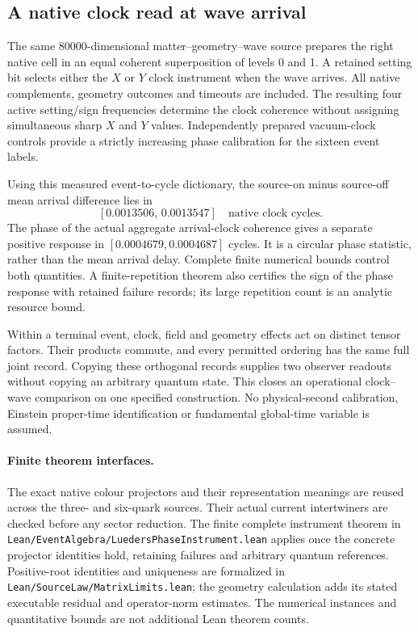 \subsection{A native clock read at wave arrival}

The same 80000-dimensional matter--geometry--wave source prepares the right
native cell in an equal coherent superposition of levels 0 and 1.
A retained setting bit selects either the $X$ or $Y$ clock instrument when
the wave arrives. All native complements, geometry outcomes and timeouts
are included. The resulting four active setting/sign frequencies determine
the clock coherence without assigning simultaneous sharp $X$ and $Y$ values.
Independently prepared vacuum-clock controls provide a strictly increasing
phase calibration for the sixteen event labels.

Using this measured event-to-cycle dictionary, the source-on minus
source-off mean arrival difference lies in
\[
 [0.0013506,\,0.0013547]\quad\text{native clock cycles}.
\]
The phase of the actual aggregate arrival-clock coherence gives a separate
positive response in
$[0.0004679,0.0004687]$ cycles. It is a circular phase statistic, rather than
the mean arrival delay. Complete finite numerical bounds control both
quantities. A finite-repetition theorem also certifies the sign of the
phase response with retained failure records; its large repetition count
is an analytic resource bound.

Within a terminal event, clock, field and geometry effects act on distinct
tensor factors. Their products commute, and every permitted ordering has
the same full joint record. Copying these orthogonal records supplies two
observer readouts without copying an arbitrary quantum state. This closes
an operational clock--wave comparison on one specified construction.
No physical-second calibration, Einstein proper-time identification or
fundamental global-time variable is assumed.


\paragraph{Finite theorem interfaces.}
The exact native colour projectors and their representation meanings are
reused across the three- and six-quark sources. Their actual current
intertwiners are checked before any sector reduction. The finite complete
instrument theorem in
\texttt{Lean/EventAlgebra/LuedersPhaseInstrument.lean} applies once the
concrete projector identities hold, retaining failures and arbitrary
quantum references. Positive-root identities and uniqueness are formalized
in \texttt{Lean/SourceLaw/MatrixLimits.lean}; the geometry calculation adds
its stated executable residual and operator-norm estimates. The numerical
instances and quantitative bounds are not additional Lean theorem counts.
